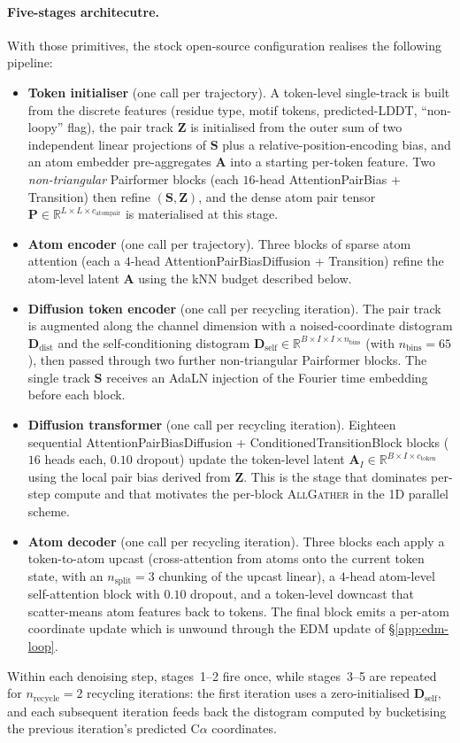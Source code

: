 \documentclass{article}
\theoremstyle{plain}
\theoremstyle{definition}
\theoremstyle{remark}
\begin{document}
\paragraph{Five-stages architecutre.} With those primitives, the stock open-source configuration realises the following pipeline:
\begin{itemize}
\item \textbf{Token initialiser} (one call per trajectory). A token-level single-track is built from the discrete features (residue type, motif tokens, predicted-LDDT, ``non-loopy'' flag), the pair track $\mathbf{Z}$ is initialised from the outer sum of two independent linear projections of $\mathbf{S}$ plus a relative-position-encoding bias, and an atom embedder pre-aggregates $\mathbf{A}$ into a starting per-token feature. Two \emph{non-triangular} Pairformer blocks (each $16$-head AttentionPairBias + Transition) then refine $(\mathbf{S},\mathbf{Z})$, and the dense atom pair tensor $\mathbf{P}\in\mathbb{R}^{L\times L\times c_\text{atompair}}$ is materialised at this stage.
\item \textbf{Atom encoder} (one call per trajectory). Three blocks of sparse atom attention (each a $4$-head AttentionPairBiasDiffusion + Transition) refine the atom-level latent $\mathbf{A}$ using the kNN budget described below.
\item \textbf{Diffusion token encoder} (one call per recycling iteration). The pair track is augmented along the channel dimension with a noised-coordinate distogram $\mathbf{D}_\text{dist}$ and the self-conditioning distogram $\mathbf{D}_\text{self}\in\mathbb{R}^{B\times I\times I\times n_\text{bins}}$ (with $n_\text{bins}=65$), then passed through two further non-triangular Pairformer blocks. The single track $\mathbf{S}$ receives an AdaLN injection of the Fourier time embedding before each block.
\item \textbf{Diffusion transformer} (one call per recycling iteration). Eighteen sequential AttentionPairBiasDiffusion + ConditionedTransitionBlock blocks ($16$ heads each, $0.10$ dropout) update the token-level latent $\mathbf{A}_I\in\mathbb{R}^{B\times I\times c_\text{token}}$ using the local pair bias derived from $\mathbf{Z}$. This is the stage that dominates per-step compute and that motivates the per-block \textsc{AllGather} in the 1D parallel scheme.
\item \textbf{Atom decoder} (one call per recycling iteration). Three blocks each apply a token-to-atom upcast (cross-attention from atoms onto the current token state, with an $n_\text{split}=3$ chunking of the upcast linear), a $4$-head atom-level self-attention block with $0.10$ dropout, and a token-level downcast that scatter-means atom features back to tokens. The final block emits a per-atom coordinate update which is unwound through the EDM update of \S\ref{app:edm-loop}.
\end{itemize}
Within each denoising step, stages~1--2 fire once, while stages~3--5 are repeated for $n_\text{recycle}=2$ recycling iterations: the first iteration uses a zero-initialised $\mathbf{D}_\text{self}$, and each subsequent iteration feeds back the distogram computed by bucketising the previous iteration's predicted C$\alpha$ coordinates.
\end{document}
